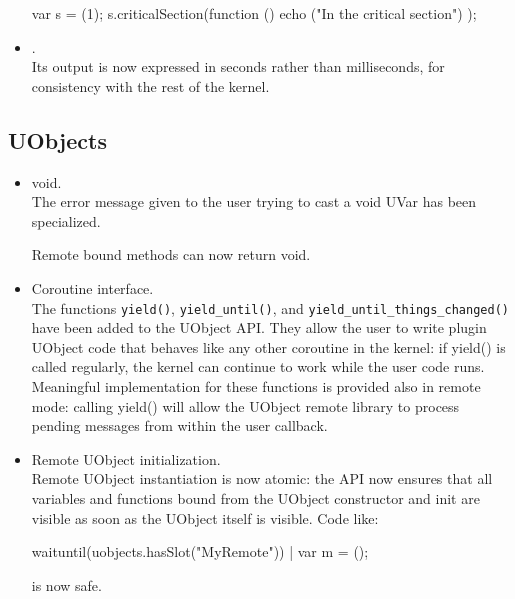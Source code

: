 \begin{itemize}
\begin{urbiunchecked}
var s = (1);
s.criticalSection(function () { echo ("In the critical section") });
\end{urbiunchecked}

\item {}.\\
  Its output is now expressed in seconds rather than milliseconds, for
  consistency with the rest of the kernel.
\end{itemize}

\subsection{UObjects}

\begin{itemize}
\item void.\\
  The error message given to the user trying to cast a void UVar has been
  specialized.

  Remote bound methods can now return void.


\item Coroutine interface.\\
  The functions \lstinline|yield()|, \lstinline|yield_until()|, and
  \lstinline|yield_until_things_changed()| have been added to the UObject
  API. They allow the user to write plugin UObject code that behaves like
  any other coroutine in the kernel: if yield() is called regularly, the
  kernel can continue to work while the user code runs.  Meaningful
  implementation for these functions is provided also in remote mode:
  calling yield() will allow the UObject remote library to process pending
  messages from within the user callback.

\item Remote UObject initialization.\\
  Remote UObject instantiation is now atomic: the API now ensures that all
  variables and functions bound from the UObject constructor and init are
  visible as soon as the UObject itself is visible. Code like:

\begin{urbiunchecked}
waituntil(uobjects.hasSlot("MyRemote")) | var m = ();
\end{urbiunchecked}

\noindent
is now safe.
\end{itemize}

